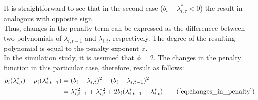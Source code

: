 \documentclass[../main.tex]{subfiles}
\begin{document}
It is straightforward to see that in the second case ($ b_i - \lambda_{i, \tau}^* < 0$) the result in analogous with opposite sign.\\
Thus, changes in the penalty term can be expressed as the differencee between two polynomials of $\lambda_{i,t-1}$ and $\lambda_{i,t}$, respectively. The degree of the resulting polynomial is equal to the penalty exponent $\phi$.\\
In the simulation study, it is assumed that $\phi = 2$. The changes in the penalty function in this particular case, therefore, result as follows:
\begin{align}
	\rho_{i}(\lambda_{i,t}^*) - \rho_{i}(\lambda_{i,t-1}^*) &= (b_i - \lambda_{i,t})^2 - (b_i - \lambda_{i,t-1})^2 \nonumber \\
	{} &= \lambda_{i,t-1}^{*2} + \lambda_{i,t}^{*2} + 2b_i(\lambda_{i,t-1}^* + \lambda_{i,t}^*) \tag{\ref{eq:changes_in_penalty}}
\end{align}
\end{document}
